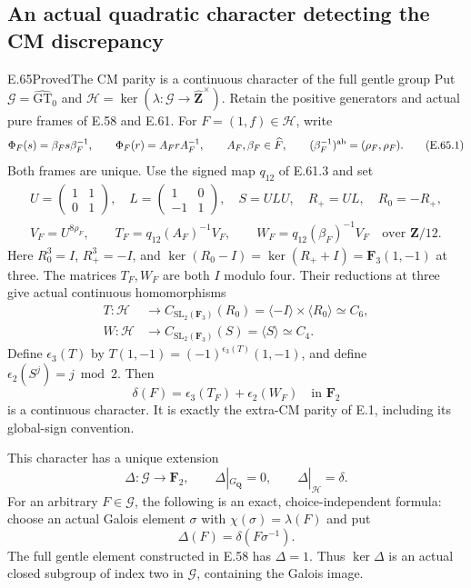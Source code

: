 \subsection{An actual quadratic character detecting the CM discrepancy}

\begin{statement}{E.65}{Proved}{The CM parity is a continuous character of the full gentle group}
Put $\mathcal G=\widehat{\mathrm{GT}}_0$ and
$\mathcal H=\ker(\lambda:\mathcal G\to\widehat{\mathbf Z}^{\times})$.
Retain the positive generators and actual pure frames of E.58 and E.61.
For $F=(1,f)\in\mathcal H$, write
\[
 \Phi_F(s)=\beta_Fs\beta_F^{-1},\qquad
 \Phi_F(r)=A_FrA_F^{-1},\qquad
 A_F,\beta_F\in\widehat F,
 \qquad (\beta_F^{-1})^{\rm ab}=(\rho_F,\rho_F).
 \tag{E.65.1}
\]
Both frames are unique. Use the signed map $q_{12}$ of E.61.3 and set
\[
 \begin{gathered}
 U=\begin{pmatrix}1&1\\0&1\end{pmatrix},\quad
 L=\begin{pmatrix}1&0\\-1&1\end{pmatrix},\quad
 S=ULU,\quad R_+=UL,\quad R_0=-R_+,\\
 V_F=U^{8\rho_F},\qquad
 T_F=q_{12}(A_F)^{-1}V_F,\qquad
 W_F=q_{12}(\beta_F)^{-1}V_F
                    \quad\text{over }\mathbf Z/12.
 \end{gathered}
 \tag{E.65.2}
\]
Here $R_0^3=I$, $R_+^3=-I$, and
$\ker(R_0-I)=\ker(R_++I)=\mathbf F_3(1,-1)$ at three.
The matrices $T_F,W_F$ are both $I$ modulo four. Their reductions
at three give actual continuous homomorphisms
\[
 \begin{split}
 T:\mathcal H&\longrightarrow
 C_{\mathrm{SL}_2(\mathbf F_3)}(R_0)
       =\langle -I\rangle\times\langle R_0\rangle\simeq C_6,\\
 W:\mathcal H&\longrightarrow
 C_{\mathrm{SL}_2(\mathbf F_3)}(S)
       =\langle S\rangle\simeq C_4.
 \end{split}
 \tag{E.65.3}
\]
Define $\epsilon_3(T)$ by
$T(1,-1)=(-1)^{\epsilon_3(T)}(1,-1)$, and define
$\epsilon_2(S^j)=j\bmod2$. Then
\[
       \delta(F)=\epsilon_3(T_F)+\epsilon_2(W_F)
                    \quad\text{in }\mathbf F_2
 \tag{E.65.4}
\]
is a continuous character. It is exactly the extra-CM parity of E.1,
including its global-sign convention.

This character has a unique extension
\[
 \Delta:\mathcal G\longrightarrow\mathbf F_2,
 \qquad \Delta|_{G_{\mathbf Q}}=0,
 \qquad \Delta|_{\mathcal H}=\delta.
 \tag{E.65.5}
\]
For an arbitrary $F\in\mathcal G$, the following is an exact,
choice-independent formula: choose an actual Galois element
$\sigma$ with $\chi(\sigma)=\lambda(F)$ and put
\[
                    \Delta(F)=\delta(F\sigma^{-1}).
 \tag{E.65.6}
\]
The full gentle element constructed in E.58 has $\Delta=1$.
Thus $\ker\Delta$ is an actual closed subgroup of index two in
$\mathcal G$, containing the Galois image.


\end{statement}
